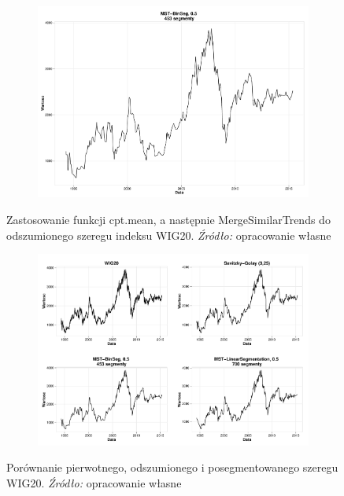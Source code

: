 \documentclass[polish, twoside, 12pt, a4paper]{article}
\theoremstyle{definition}
\theoremstyle{plain}
\theoremstyle{remark}
\begin{document}
\begin{figure}[H]
  \centering

  \begin{subfigure}[t]{1.00\textwidth}
    \includegraphics[width=\textwidth]{./rys003}
  \end{subfigure}

  \captionsetup{margin=10pt,font=small,labelfont=bf,width=.8\textwidth}

  \caption[Zastosowanie funkcji cpt.mean, a następnie MergeSimilarTrends]{Zastosowanie funkcji cpt.mean, a następnie MergeSimilarTrends do odszumionego szeregu indeksu WIG20. \textit{Źródło:} opracowanie własne}\label{rys003}
\end{figure}

\begin{figure}[H]
  \centering

  \begin{subfigure}[t]{1.00\textwidth}
    \includegraphics[width=\textwidth]{./rys005}
  \end{subfigure}

  \captionsetup{margin=10pt,font=small,labelfont=bf,width=.8\textwidth}

  \caption[Porównanie pierwotnego, odszumionego i posegmentowanego szeregu WIG20]{Porównanie pierwotnego, odszumionego i posegmentowanego szeregu WIG20. \textit{Źródło:} opracowanie własne}\label{rys005}
\end{figure}
\end{document}
